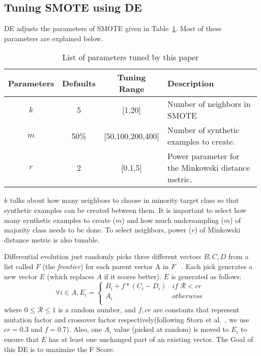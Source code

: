 \documentclass[conference]{IEEEtran}
\begin{document}
\subsection{Tuning SMOTE using DE}
\label{sect:tuning}

DE  adjusts the parameters of SMOTE given in
Table~\ref{tb:tuned}. Most of these parameters are explained below. 

\begin{table}[!htbp]
    \begin{center}
\scriptsize
\begin{tabular}{|c|c|c|p{3.5cm}|}
        \hline 
        \textbf{Parameters} & \textbf{Defaults} & \textbf{Tuning Range} & \textbf{Description}\\
        \hline
        $k$ & 5 & [1,20] & Number of neighbors in SMOTE \\ 
        \hline
       $m$ & 50\% & [50,100,200,400] & Number of synthetic examples to create. \\ 
        \hline
        $r$ & 2 & [0.1,5] & Power parameter for the Minkowski distance metric.\\

        \hline
\end{tabular}
\end{center}
\caption{List of parameters tuned by this paper}
\label{tb:tuned}
\end{table}
 
 $k$ talks about how many neighbors to choose in minority target class so that synthetic examples can be created between them. It is important to select how many synthetic examples to create ($m$) and how much undersampling ($m$) of majority class needs to be done. To select neighbors, power ($r$) of Minkowski distance metric is also tunable.

Differential evolution just randomly picks three different vectors  
$B,C,D$ from a list called $F$ (the {\em frontier}) for each parent vector A in $F$ ~\cite{storn1997differential}. 
Each pick generates a new
vector $E$ (which replaces $A$ if  it scores better).
$E$ is generated as follows:
\begin{equation} \label{eq:de}
  \forall i \in A,  E_i=
    \begin{cases}
      B_i + f*(C_i - D_i)& \mathit{if}\;  \mathcal{R} < \mathit{cr}  \\
      A_i&   \mathit{otherwise}\\ 
    \end{cases}
\end{equation}
where $0 \le \mathcal{R} \le 1$ is a random number,
and $f,cr$ are constants that represent mutation factor and crossover factor respectively(following
Storn et al.~\cite{storn1997differential}, we use $cr=0.3$ and $f=0.7$).
Also, one $A_i$ value (picked at
random)
is moved to $E_i$ to ensure that $E$ has at least one
unchanged part of an existing vector. The Goal of this DE is to maximize the F Score.
\end{document}
